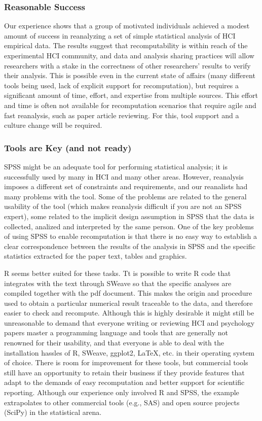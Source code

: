 \subsubsection{Reasonable Success}
Our experience shows that a group of motivated individuals achieved a modest amount of success in reanalyzing a set of simple statistical analysis of HCI empirical data. The results suggest that recomputability is within reach of the experimental HCI community, and data and analysis sharing practices will allow researchers with a stake in the correctness of other researchers' results to verify their analysis. This is possible even in the current state of affairs (many different tools being used, lack of explicit support for recomputation), but requires a significant amount of time, effort, and expertise from multiple sources. This effort and time is often not available for recomputation scenarios that require agile and fast reanalysis, such as paper article reviewing. For this, tool support and a culture change will be required. 

\subsubsection{Tools are Key (and not ready)}
SPSS might be an adequate tool for performing statistical analysis; it is successfully used by many in HCI and many other areas. However, reanalysis imposes a different set of constraints and requirements, and our reanalists had many problems with the tool. Some of the problems are related to the general usability of the tool (which makes reanalysis difficult if you are not an SPSS expert), some related to the implicit design assumption in SPSS that the data is collected, analized and interpreted by the same person. One of the key problems of using SPSS to enable recomputation is that there is no easy way to establish a clear correspondence between the results of the analysis in SPSS and the specific statistics extracted for the paper text, tables and graphics. 

R seems better suited for these tasks. Tt is possible to write R code that integrates with the text through SWeave \cite{sweave} so that the specific analyses are compiled together with the pdf document. This makes the origin and procedure used to obtain a particular numerical result traceable to the data, and therefore easier to check and recompute. Although this is highly desirable it might still be unreasonable to demand that everyone writing or reviewing HCI and psychology papers master a programming language and tools that are generally not renowned for their usability, and that everyone is able to deal with the installation hassles of R, SWeave, ggplot2, LaTeX, etc. in their operating system of choice. There is room for improvement for these tools, but commercial tools still have an opportunity to retain their business if they provide features that adapt to the demands of easy recomputation and better support for scientific reporting. Although our experience only involved R and SPSS, the example extrapolates to other commercial tools (e.g., SAS) and open source projects (SciPy) in the statistical arena.

